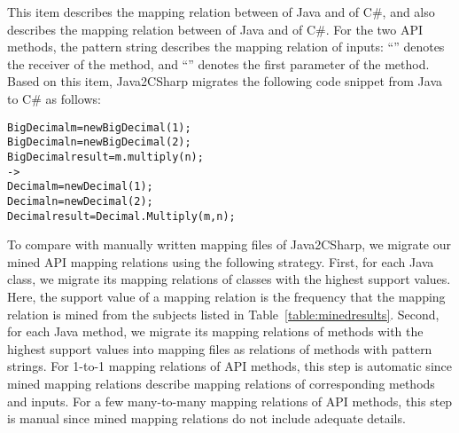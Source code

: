 This item describes the mapping relation between  of Java and  of C\#, and also describes the mapping relation between 
of Java and  of C\#. For the two API methods, the pattern
string describes the mapping relation of inputs:
``'' denotes the receiver of the 
method, and ``'' denotes the first parameter of the
 method. Based on this item, Java2CSharp migrates
the following code snippet from Java to C\# as follows:

\begin{CodeOut}\vspace*{-2ex}
\begin{alltt}
  BigDecimal m = new BigDecimal(1);
  BigDecimal n = new BigDecimal(2);
  BigDecimal result = m.multiply(n);
  ->
  Decimal m = new Decimal(1);
  Decimal n = new Decimal(2);
  Decimal result = Decimal.Multiply(m,n);
\end{alltt}
\end{CodeOut}\vspace*{-2ex}

To compare with manually written mapping files of Java2CSharp, we
migrate our mined API mapping relations using the following strategy. First,
for each Java class, we migrate its mapping relations of classes
with the highest support values. Here, the support value of a mapping relation is the frequency that the mapping relation is mined from the subjects listed in Table~\ref{table:minedresults}. Second, for each Java method, we migrate its
mapping relations of methods with the highest support values into mapping
files as relations of methods with pattern strings. For 1-to-1
mapping relations of API methods, this step is automatic since mined
mapping relations describe mapping relations of corresponding
methods and inputs. For a few many-to-many mapping relations of API methods,
this step is manual since mined mapping relations do not include
adequate details.

